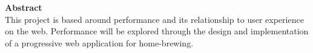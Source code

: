 \vspace*{\fill}
  \begin{center}
    \textbf{Abstract}\\
    This project is based around performance and its relationship to user experience on the web. Performance will be explored through the design and implementation of a progressive web application for home-brewing.
  \end{center}
\vspace*{\fill}
\pagebreak

